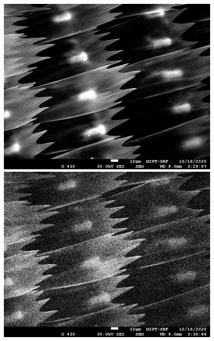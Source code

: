 \documentclass[a4paper]{article}
\begin{document}
\begin{enumerate}
    \begin{figure}[h]
        \begin{center}
        \begin{minipage}[h]{0.45\linewidth}
        \includegraphics[width=1\linewidth]{Buterfly01.jpg}
        \caption{} 
        \label{Buterfly01}
        \end{minipage}
        \hfill 
        \begin{minipage}[h]{0.45\linewidth}
        \includegraphics[width=1\linewidth]{Buterfly02.jpg}
        \caption{}
        \label{Buterfly02}
        \end{minipage}
        \end{center}
    \end{figure}


\end{enumerate}
\end{document}
